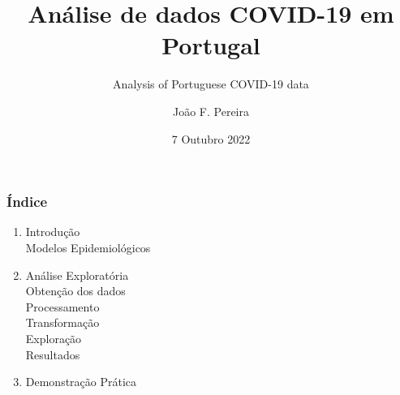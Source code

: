 \documentclass[pdf]
{beamer}
\title{Análise de dados COVID-19 em Portugal}
\subtitle{Analysis of Portuguese COVID-19 data}
\author{João F. Pereira}
\date{7 Outubro 2022}
\begin{document}
	
\begin{frame}
\titlepage
\end{frame}

\begin{frame}
	\frametitle{Índice}
	\begin{enumerate}
		\item Introdução
			\\ \textcolor{ExecusharesGrey}{\footnotesize\hspace{1em }Modelos Epidemiológicos}
		\item Análise Exploratória  
			\\ \textcolor{ExecusharesGrey}{\footnotesize\hspace{1em}Obtenção dos dados}
			\\ \textcolor{ExecusharesGrey}{\footnotesize\hspace{1em}Processamento}
			\\ \textcolor{ExecusharesGrey}{\footnotesize\hspace{1em}Transformação}
			\\ \textcolor{ExecusharesGrey}{\footnotesize\hspace{1em}Exploração}
			\\ \textcolor{ExecusharesGrey}{\footnotesize\hspace{1em}Resultados}
		\item Demonstração Prática
	\end{enumerate}
\end{frame}
	
\end{document}
